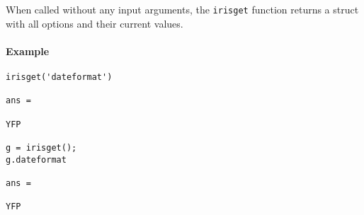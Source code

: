 When called without any input arguments, the \texttt{irisget} function
returns a struct with all options and their current values.

\paragraph{Example}\label{example}

\begin{verbatim}
irisget('dateformat')

ans =

YFP

g = irisget();
g.dateformat

ans =

YFP
\end{verbatim}


